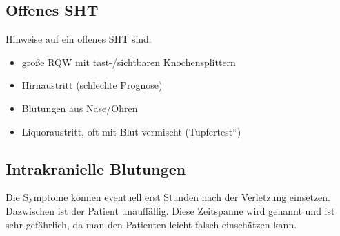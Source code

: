 \subsection{Offenes SHT}

{
Hinweise auf ein offenes SHT sind:

\begin{itemize}
    \item große RQW mit tast-/sichtbaren  Knochensplittern
    \item Hirnaustritt (schlechte Prognose)
    \item Blutungen aus Nase/Ohren
    \item Liquoraustritt, oft mit Blut vermischt
    ({\quotedblbase}Tupfertest{\textquotedblleft})
\end{itemize}
}{

}{}{}{}




\subsection{Intrakranielle Blutungen}

{
Die Symptome können eventuell erst Stunden nach der
Verletzung einsetzen. Dazwischen ist der Patient unauffällig.
Diese Zeitspanne wird  genannt und ist
sehr gefährlich, da man den Patienten leicht falsch
einschätzen kann.
}{

}{}{}{}


